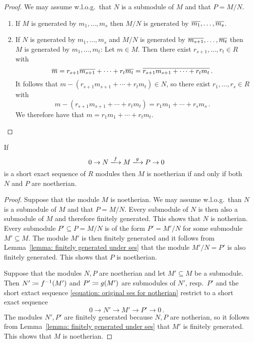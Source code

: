 \begin{proof}
  We may assume w.l.o.g.\ that $N$ is a submodule of $M$ and that $P = M/N$.
  \begin{enumerate}
    \item
      If $M$ is generated by $m_1, \dotsc, m_s$ then $M/N$ is generated by $\overline{m_1}, \dotsc, \overline{m_s}$.
    \item
      If $N$ is generated by $m_1, \dotsc, m_s$ and $M/N$ is generated by $\overline{m_{s+1}}, \dotsc, \overline{m_t}$ then $M$ is generated by $m_1, \dotsc, m_t$:
      Let $m \in M$.
      Then there exist $r_{s+1}, \dotsc, r_t \in R$ with
      \[
          \overline{m}
        = r_{s+1} \overline{m_{s+1}} + \dotsb + r_t \overline{m_t}
        = \overline{r_{s+1} m_{s+1} + \dotsb + r_t m_t} \,.
      \]
      It follows that $m - (r_{s+1} m_{s+1} + \dotsb + r_t m_t) \in N$, so there exist $r_1, \dotsc, r_s \in R$ with
      \[
          m - (r_{s+1} m_{s+1} + \dotsb + r_t m_t)
        = r_1 m_1 + \dotsb + r_s m_s \,.
      \]
      We therefore have that $m = r_1 m_1 + \dotsb + r_t m_t$.
    \qedhere
  \end{enumerate}
\end{proof}


\begin{corollary}
  \label{corollary: short exact sequence of noetherian}
  If
  \begin{equation}
    \label{equation: original ses for notherian}
                        0
    \to                 N
    \xlongrightarrow{f} M
    \xlongrightarrow{g} P
    \to                 0
  \end{equation}
  is a short exact sequence of $R$ modules then $M$ is noetherian if and only if both $N$ and $P$ are noetherian.
\end{corollary}


\begin{proof}
  Suppose that the module $M$ is noetherian.
  We may assume w.l.o.g.\ than $N$ is a submodule of $M$ and that $P = M/N$.
  Every submodule of $N$ is then also a submodule of $M$ and therefore finitely generated.
  This shows that $N$ is notherian.
  Every submodule $P' \subseteq P = M/N$ is of the form $P' = M'/N$ for some submodule $M' \subseteq M$.
  The module $M'$ is then finitely generated and it follows from Lemma~\ref{lemma: finitely generated under ses} that the module $M'/N = P'$ is also finitely generated.
  This shows that $P$ is noetherian.

  Suppose that the modules $N, P$ are noetherian and let $M' \subseteq M$ be a submodule.
  Then $N' \coloneqq f^{-1}(M')$ and $P' \coloneqq g(M')$ are submodules of $N'$, resp.\ $P'$ and the short extact sequence \eqref{equation: original ses for notherian} restrict to a short exact sequence
  \[
        0
    \to N'
    \to M'
    \to P'
    \to 0 \,.
  \]
  The modules $N', P'$ are finitely generated because $N, P$ are notherian, so it follows from Lemma~\ref{lemma: finitely generated under ses} that $M'$ is finitely generated.
  This shows that $M$ is noetherian.
\end{proof}



